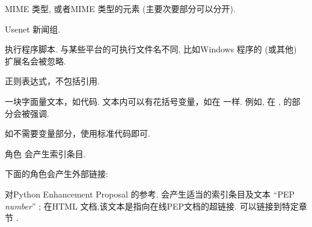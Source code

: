 \documentclass[letterpaper,10pt,english]{sphinxmanual}
\begin{document}

\begin{fulllineitems}
\label{markup/inline:role-mimetype}
MIME 类型, 或者MIME 类型的元素 (主要次要部分可以分开).

\end{fulllineitems}


\begin{fulllineitems}
\label{markup/inline:role-newsgroup}
Usenet 新闻组.

\end{fulllineitems}


\begin{fulllineitems}
\label{markup/inline:role-program}
执行程序脚本.  与某些平台的可执行文件名不同, 比如Windows 程序的  (或其他)
扩展名会被忽略.

\end{fulllineitems}


\begin{fulllineitems}
\label{markup/inline:role-regexp}
正则表达式，不包括引用.

\end{fulllineitems}


\begin{fulllineitems}
\label{markup/inline:role-samp}
一块字面量文本，如代码.  文本内可以有花括号变量，如在 {\hyperref[markup/inline:role\string-file]{}} 一样.
例如, 在 ,  的部分会被强调.

如不需要变量部分，使用标准代码即可.

\end{fulllineitems}


角色 {\hyperref[markup/misc:role\string-index]{}} 会产生索引条目.

下面的角色会产生外部链接:

\begin{fulllineitems}
\label{markup/inline:role-pep}
对Python Enhancement Proposal 的参考.  会产生适当的索引条目及文本 ``PEP \emph{number}'' ;
在HTML 文档,该文本是指向在线PEP文档的超链接.  可以链接到特定章节 .

\end{fulllineitems}
\end{document}
